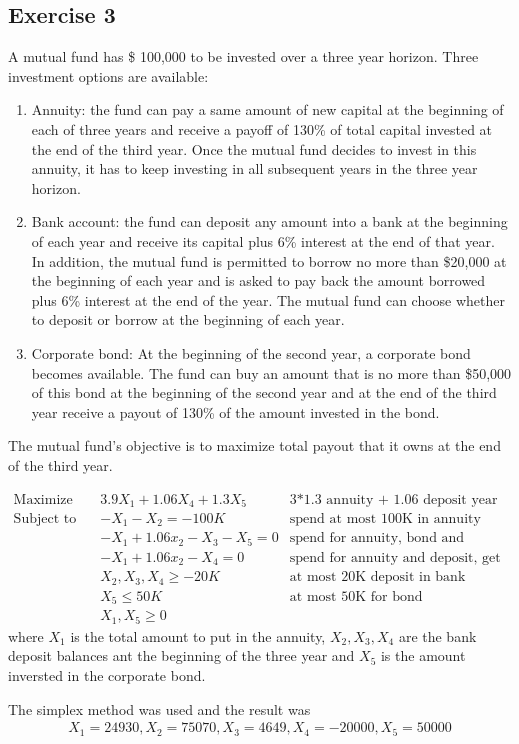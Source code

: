 \subsection{Exercise 3}
A mutual fund has \$ 100,000 to be invested over a three year horizon.
Three investment options are available:

\begin{enumerate}
    \item Annuity: the fund can pay a same amount of new capital at the beginning of each of three years and receive a payoff of 130\% of total capital invested at the end of the third year. Once the mutual fund decides to invest in this annuity, it has to keep investing in all subsequent years in the three year horizon.
    \item Bank account: the fund can deposit any amount into a bank at the beginning of each year and receive its capital plus 6\% interest at the end of that year. In addition, the mutual fund is permitted to borrow no more than \$20,000 at the beginning of each year and is asked to pay back the amount borrowed plus 6\% interest at the end of the year. The mutual fund can choose whether to deposit or borrow at the beginning of each year.
    \item Corporate bond: At the beginning of the second year, a corporate bond becomes available. The fund can buy an amount that is no more than \$50,000 of this bond at the beginning of the second year and at the end of the third year receive a payout of 130\% of the amount invested in the bond.
\end{enumerate}
The mutual fund’s objective is to maximize total payout that it owns at the end of the third year.

\begin{equation}
    \begin{aligned}
        \text{Maximize} \quad   & 3.9X_1 + 1.06X_4 + 1.3X_5  & \text{3*1.3 annuity + 1.06 deposit year 3 + 1.3 bond } \\
        \text{Subject to} \quad & - X_1 - X_2 = - 100K      & \text{spend at most 100K in annuity and deposit}        \\
                                & - X_1 + 1.06x_2 - X_3 - X_5 = 0 & \text{spend for annuity, bond and deposit, get capital}        \\
                                & - X_1 + 1.06x_2 - X_4 = 0       & \text{spend for annuity and deposit, get capital}        \\
                                & X_2, X_3, X_4 \ge -20K   & \text{at most 20K deposit in bank}        \\
                                & X_5 \leq 50K             & \text{at most 50K for bond}         \\
                                & X_1, X_5 \geq 0                 &
    \end{aligned}
\end{equation}
where $X_1$ is the total amount to put in the annuity, $X_2, X_3, X_4$ are the bank deposit balances ant the beginning of the three year and $X_5$ is the amount inversted in the corporate bond.

The simplex method was used and the result was
\begin{equation}
    \begin{aligned}
        X_1 = 24930, X_2 = 75070, X_3 = 4649, X_4 = -20000, X_5 = 50000
    \end{aligned}
\end{equation}
